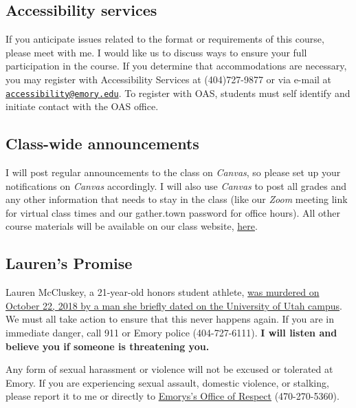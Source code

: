 \documentclass[11pt,]{article}
\begin{document}
\hypertarget{accessibility-services}{%
\subsection{Accessibility services}\label{accessibility-services}}

If you anticipate issues related to the format or requirements of this
course, please meet with me. I would like us to discuss ways to ensure
your full participation in the course. If you determine that
accommodations are necessary, you may register with Accessibility
Services at (404)727-9877 or via e-mail at
\href{mailto:accessibility@emory.edu}{\nolinkurl{accessibility@emory.edu}}.
To register with OAS, students must self identify and initiate contact
with the OAS office.

\hypertarget{class-wide-announcements}{%
\subsection{Class-wide announcements}\label{class-wide-announcements}}

I will post regular announcements to the class on \emph{Canvas}, so
please set up your notifications on \emph{Canvas} accordingly. I will
also use \emph{Canvas} to post all grades and any other information that
needs to stay in the class (like our \emph{Zoom} meeting link for
virtual class times and our gather.town password for office hours). All
other course materials will be available on our class website,
\href{https://econ372s21.classes.ianmccarthyecon.com/}{here}.

\hypertarget{laurens-promise}{%
\subsection{Lauren's Promise}\label{laurens-promise}}

Lauren McCluskey, a 21-year-old honors student athlete,
\href{https://www.sltrib.com/opinion/commentary/2019/02/10/commentary-failing-lauren/}{was
murdered on October 22, 2018 by a man she briefly dated on the
University of Utah campus}. We must all take action to ensure that this
never happens again. If you are in immediate danger, call 911 or Emory
police (404-727-6111). \textbf{I will listen and believe you if someone
is threatening you.}

Any form of sexual harassment or violence will not be excused or
tolerated at Emory. If you are experiencing sexual assault, domestic
violence, or stalking, please report it to me or directly to
\href{http://respect.emory.edu/index.html}{Emorys's Office of Respect}
(470-270-5360).
\end{document}
